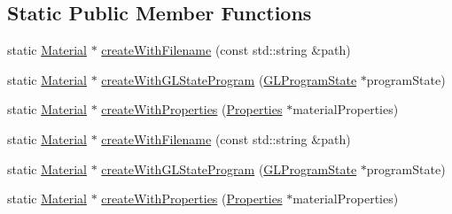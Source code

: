\subsection*{Static Public Member Functions}
\begin{DoxyCompactItemize}
\item 
static \hyperlink{classMaterial}{Material} $\ast$ \hyperlink{classMaterial_a1244126a35a456342473cd18ce05c86f}{create\+With\+Filename} (const std\+::string \&path)
\item 
static \hyperlink{classMaterial}{Material} $\ast$ \hyperlink{classMaterial_a624a466fcb166e01fe57a98f209365f4}{create\+With\+G\+L\+State\+Program} (\hyperlink{classGLProgramState}{G\+L\+Program\+State} $\ast$program\+State)
\item 
static \hyperlink{classMaterial}{Material} $\ast$ \hyperlink{classMaterial_aaeceb55f231edb94919198b18d9ec1ca}{create\+With\+Properties} (\hyperlink{classProperties}{Properties} $\ast$material\+Properties)
\item 
static \hyperlink{classMaterial}{Material} $\ast$ \hyperlink{classMaterial_aeebb1e32ac992f8d8f79c6a7c98a4fb1}{create\+With\+Filename} (const std\+::string \&path)
\item 
static \hyperlink{classMaterial}{Material} $\ast$ \hyperlink{classMaterial_a1a39fdd599b90431a49866a3c27ccfae}{create\+With\+G\+L\+State\+Program} (\hyperlink{classGLProgramState}{G\+L\+Program\+State} $\ast$program\+State)
\item 
static \hyperlink{classMaterial}{Material} $\ast$ \hyperlink{classMaterial_acd4f5fcbc5b60661fb07ae21ef7930dc}{create\+With\+Properties} (\hyperlink{classProperties}{Properties} $\ast$material\+Properties)
\end{DoxyCompactItemize}
